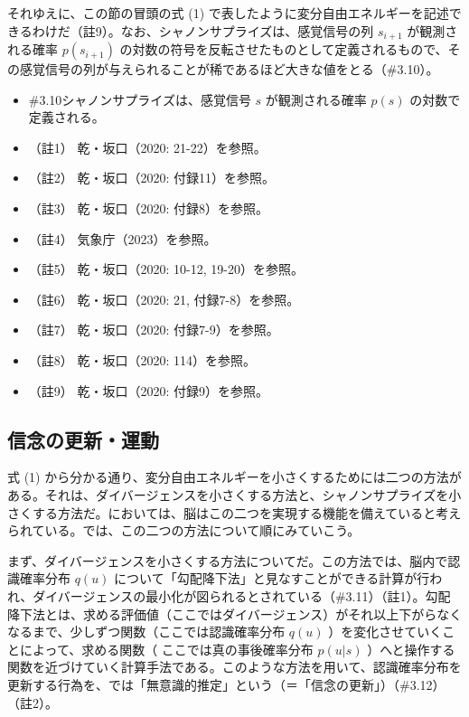 それゆえに、この節の冒頭の式 (1)
で表したように変分自由エネルギーを記述できるわけだ（註9）。なお、シャノンサプライズは、感覚信号の列
\(s_{i+1}\) が観測される確率 \(p(s_{i+1})\)
の対数の符号を反転させたものとして定義されるもので、その感覚信号の列が与えられることが稀であるほど大きな値をとる（\#3.10）。

\begin{note}{}
  \begin{itemize}
    \tightlist
    \item{\#3.10}シャノンサプライズは、感覚信号 $s$ が観測される確率 $p(s)$ の対数で定義される。
  \end{itemize}
\end{note}

\begin{itemize}
\tightlist
\item
  （註1） 乾・坂口（2020: 21-22）\cite{InuiAndSakaguchi}を参照。
\item
  （註2） 乾・坂口（2020: 付録11）\cite{InuiAndSakaguchi}を参照。
\item
  （註3） 乾・坂口（2020: 付録8）\cite{InuiAndSakaguchi}を参照。
\item
  （註4） 気象庁（2023）\cite{JMA}を参照。
\item
  （註5） 乾・坂口（2020: 10-12, 19-20）\cite{InuiAndSakaguchi}を参照。
\item
  （註6） 乾・坂口（2020: 21, 付録7-8）\cite{InuiAndSakaguchi}を参照。
\item
  （註7） 乾・坂口（2020: 付録7-9）\cite{InuiAndSakaguchi}を参照。
\item
  （註8） 乾・坂口（2020: 114）\cite{InuiAndSakaguchi}を参照。
\item
  （註9） 乾・坂口（2020: 付録9）\cite{InuiAndSakaguchi}を参照。
\end{itemize}

\subsection{信念の更新・運動}\label{ux4fe1ux5ff5ux306eux66f4ux65b0ux904bux52d5}

式 (1)
から分かる通り、変分自由エネルギーを小さくするためには二つの方法がある。それは、ダイバージェンスを小さくする方法と、シャノンサプライズを小さくする方法だ。においては、脳はこの二つを実現する機能を備えていると考えられている。では、この二つの方法について順にみていこう。

まず、ダイバージェンスを小さくする方法についてだ。この方法では、脳内で認識確率分布
\(q(u)\)
について「勾配降下法」と見なすことができる計算が行われ、ダイバージェンスの最小化が図られるとされている（\#3.11）（註1）。勾配降下法とは、求める評価値（ここではダイバージェンス）がそれ以上下がらなくなるまで、少しずつ関数（ここでは認識確率分布
\(q(u)\) ）を変化させていくことによって、求める関数（
ここでは真の事後確率分布 \(p(u|s)\)
）へと操作する関数を近づけていく計算手法である。このような方法を用いて、認識確率分布を更新する行為を、では「無意識的推定」という（＝「信念の更新」）（\#3.12）（註2）。

